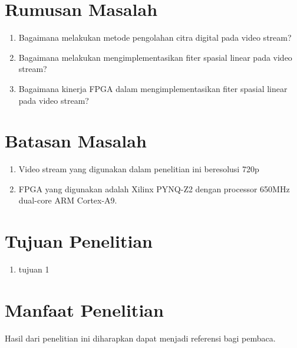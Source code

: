 \section{Rumusan Masalah}
\begin{enumerate}
    \item Bagaimana melakukan metode pengolahan citra digital pada video stream?
    \item Bagaimana melakukan mengimplementasikan fiter spasial linear pada video stream? 
    \item Bagaimana kinerja FPGA dalam mengimplementasikan fiter spasial linear pada video stream? 
\end{enumerate}

\section{Batasan Masalah}
\begin{enumerate}
    \item Video stream yang digunakan dalam penelitian ini beresolusi 720p 
    \item FPGA yang digunakan adalah Xilinx PYNQ-Z2 dengan processor 650MHz dual-core ARM Cortex-A9.
\end{enumerate}

\section{Tujuan Penelitian}
\begin{enumerate}
    \item tujuan 1
\end{enumerate}

\section{Manfaat Penelitian}
Hasil dari penelitian ini diharapkan dapat menjadi referensi bagi pembaca.






